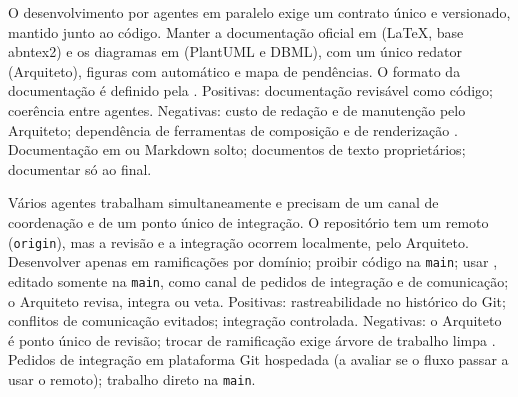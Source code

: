{O desenvolvimento por agentes em paralelo exige um contrato único e versionado, mantido junto ao código.}
{Manter a documentação oficial em  (\LaTeX{}, base abntex2) e os diagramas em  (PlantUML e DBML), com um único redator (Arquiteto), figuras com  automático e mapa de pendências. O formato da documentação é definido pela .}
{Positivas: documentação revisável como código; coerência entre agentes. Negativas: custo de redação e de manutenção pelo Arquiteto; dependência de ferramentas de composição e de renderização \cite{parnas1986rational,writethedocs}.}
{Documentação em  ou Markdown solto; documentos de texto proprietários; documentar só ao final.}

{Vários agentes trabalham simultaneamente e precisam de um canal de coordenação e de um ponto único de integração. O repositório tem um remoto (\texttt{origin}), mas a revisão e a integração ocorrem localmente, pelo Arquiteto.}
{Desenvolver apenas em ramificações por domínio; proibir código na \texttt{main}; usar , editado somente na \texttt{main}, como canal de pedidos de integração e de comunicação; o Arquiteto revisa, integra ou veta.}
{Positivas: rastreabilidade no histórico do Git; conflitos de comunicação evitados; integração controlada. Negativas: o Arquiteto é ponto único de revisão; trocar de ramificação exige árvore de trabalho limpa \cite{chacon2014progit,conventionalcommits}.}
{Pedidos de integração em plataforma Git hospedada (a avaliar se o fluxo passar a usar o remoto); trabalho direto na \texttt{main}.}

